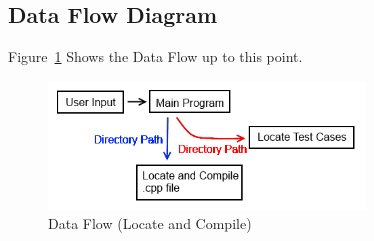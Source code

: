 \subsection{Data Flow Diagram}
Figure~\ref{DataFlow2} Shows the Data Flow up to this point.

\begin{figure}[tbh]
\begin{center}
\includegraphics[width=0.75\textwidth]{./DataFlow2}
\end{center}
\caption{Data Flow (Locate and Compile) \label{DataFlow2}}
\end{figure}


